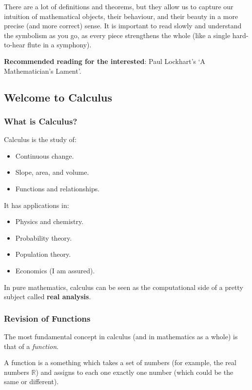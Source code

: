 There are a lot of definitions and theorems, but they allow us to capture our intuition of mathematical objects, their behaviour, and their beauty
in a more precise (and more correct) sense. It is important to read slowly and understand the symbolism as you go, as every piece strengthens the
whole (like a single hard-to-hear flute in a symphony).

\textbf{Recommended reading for the interested}: Paul Lockhart's `A Mathematician's Lament'.

\clearpage
\subsection*{Welcome to Calculus}
\subsubsection* {What is Calculus?}
Calculus is the study of:
\begin{itemize}
  \item Continuous change.
  \item Slope, area, and volume.
  \item Functions and relationships.
\end{itemize}

It has applications in:
\begin{itemize}
  \item Physics and chemistry.
  \item Probability theory.
  \item Population theory.
  \item Economics (I am assured).
\end{itemize}

In pure mathematics, calculus can be seen as the computational side of a pretty
subject called \textbf{real analysis}.

\subsubsection*{Revision of Functions}
The most fundamental concept in calculus (and in mathematics as a whole) is that of a \textit{function}.

\begin{defn}[Function]
  A function is a something which takes a set of numbers (for example, the real numbers $ \mathbb{R} $) and assigns
  to each one exactly one number (which could be the same or different).
\end{defn}

